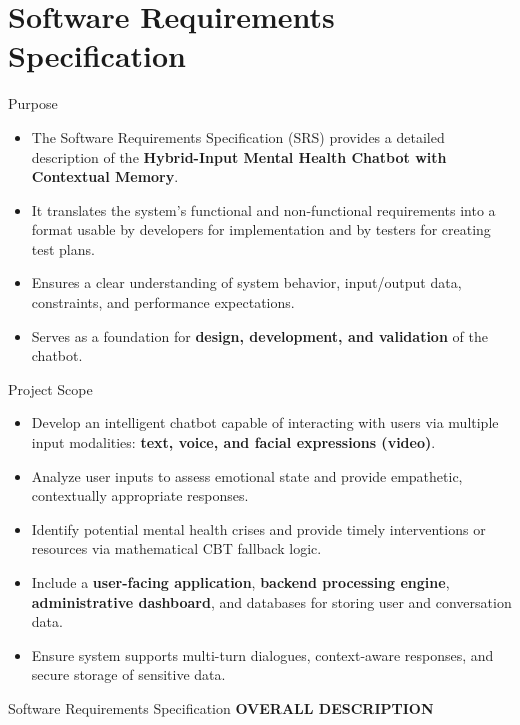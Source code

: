 \documentclass[11pt]{beamer}
\begin{document}
\section{Software Requirements Specification}
\begin{frame}{Purpose}
    \justifying
    \begin{itemize}
        \item The Software Requirements Specification (SRS) provides a detailed description of the \textbf{Hybrid-Input Mental Health Chatbot with Contextual Memory}.
        \item It translates the system's functional and non-functional requirements into a format usable by developers for implementation and by testers for creating test plans.
        \item Ensures a clear understanding of system behavior, input/output data, constraints, and performance expectations.
        \item Serves as a foundation for \textbf{design, development, and validation} of the chatbot.
    \end{itemize}
\end{frame}

\begin{frame}{Project Scope}
    \justifying
    \begin{itemize}
        \item Develop an intelligent chatbot capable of interacting with users via multiple input modalities: \textbf{text, voice, and facial expressions (video)}.
        \item Analyze user inputs to assess emotional state and provide empathetic, contextually appropriate responses.
        \item Identify potential mental health crises and provide timely interventions or resources via mathematical CBT fallback logic.
        \item Include a \textbf{user-facing application}, \textbf{backend processing engine}, \textbf{administrative dashboard}, and databases for storing user and conversation data.
        \item Ensure system supports multi-turn dialogues, context-aware responses, and secure storage of sensitive data.
    \end{itemize}
\end{frame}

\begin{frame}{Software Requirements Specification}
    \justifying
    \centering
    \huge \textbf{OVERALL DESCRIPTION}
\end{frame}
\end{document}
